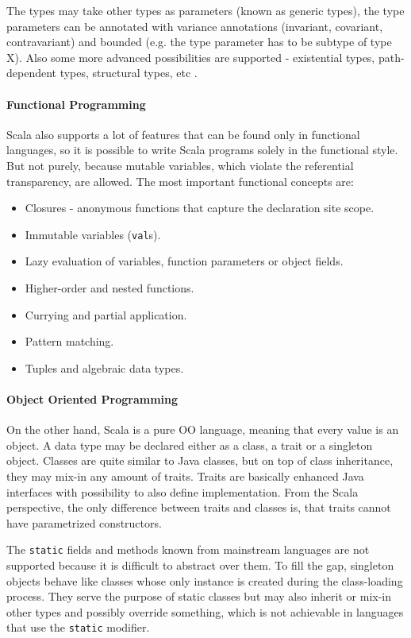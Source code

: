 \documentclass[12pt,a4paper]{report}
\begin{document}
The types may take other types as parameters (known as generic types), the type parameters can be annotated with variance annotations (invariant, covariant, contravariant) and bounded (e.g. the type parameter has to be subtype of type X). Also some more advanced possibilities are supported - existential types, path-dependent types, structural types, etc \cite{ScalaAdvancedTypes}.

\paragraph{Functional Programming} Scala also supports a lot of features that can be found only in functional languages, so it is possible to write Scala programs solely in the functional style. But not purely, because mutable variables, which violate the referential transparency, are allowed. The most important functional concepts are:

\begin{itemize}
\item Closures - anonymous functions that capture the declaration site scope.
\item Immutable variables (\texttt{val}s).
\item Lazy evaluation of variables, function parameters or object fields.
\item Higher-order and nested functions.
\item Currying and partial application.
\item Pattern matching.
\item Tuples and algebraic data types.
\end{itemize}

\paragraph{Object Oriented Programming} On the other hand, Scala is a pure OO language, meaning that every value is an object. A data type may be declared either as a class, a trait or a singleton object. Classes are quite similar to Java classes, but on top of class inheritance, they may mix-in any amount of traits. Traits are basically enhanced Java interfaces with possibility to also define implementation. From the Scala perspective, the only difference between traits and classes is, that traits cannot have parametrized constructors.

The \texttt{static} fields and methods known from mainstream languages are not supported because it is difficult to abstract over them. To fill the gap, singleton objects behave like classes whose only instance is created during the class-loading process. They serve the purpose of static classes but may also inherit or mix-in other types and possibly override something, which is not achievable in languages that use the \texttt{static} modifier.
\end{document}
